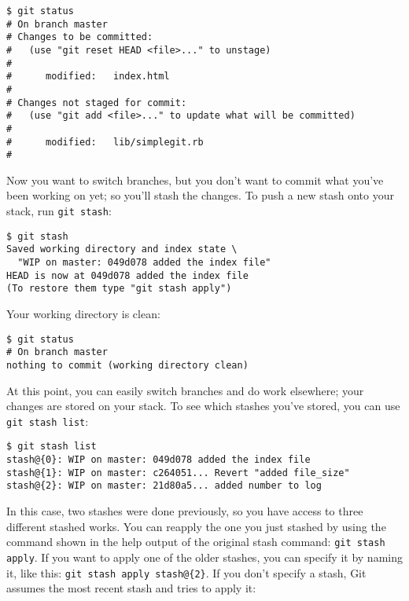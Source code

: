 \documentclass[a4paper]{book}
\begin{document}
\begin{shaded}\begin{verbatim}
$ git status
# On branch master
# Changes to be committed:
#   (use "git reset HEAD <file>..." to unstage)
#
#      modified:   index.html
#
# Changes not staged for commit:
#   (use "git add <file>..." to update what will be committed)
#
#      modified:   lib/simplegit.rb
#
\end{verbatim}\end{shaded}

Now you want to switch branches, but you don't want to commit what you've been working on yet; so you'll stash the changes. To push a new stash onto your stack, run \texttt{git stash}:

\begin{shaded}\begin{verbatim}
$ git stash
Saved working directory and index state \
  "WIP on master: 049d078 added the index file"
HEAD is now at 049d078 added the index file
(To restore them type "git stash apply")
\end{verbatim}\end{shaded}

Your working directory is clean:

\begin{shaded}\begin{verbatim}
$ git status
# On branch master
nothing to commit (working directory clean)
\end{verbatim}\end{shaded}

At this point, you can easily switch branches and do work elsewhere; your changes are stored on your stack. To see which stashes you've stored, you can use \texttt{git stash list}:

\begin{shaded}\begin{verbatim}
$ git stash list
stash@{0}: WIP on master: 049d078 added the index file
stash@{1}: WIP on master: c264051... Revert "added file_size"
stash@{2}: WIP on master: 21d80a5... added number to log
\end{verbatim}\end{shaded}

In this case, two stashes were done previously, so you have access to three different stashed works. You can reapply the one you just stashed by using the command shown in the help output of the original stash command: \texttt{git stash apply}. If you want to apply one of the older stashes, you can specify it by naming it, like this: \texttt{git stash apply stash@\{2\}}. If you don't specify a stash, Git assumes the most recent stash and tries to apply it:
\end{document}
